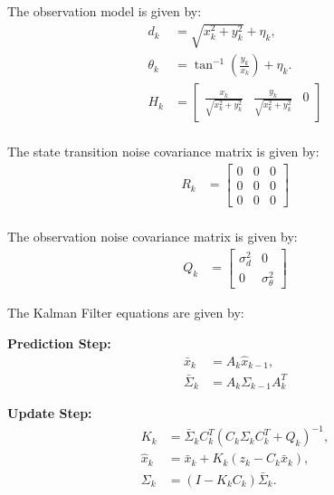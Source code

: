 \documentclass[answers]{exam}
\begin{document}
\begin{questions}
\begin{parts}
\begin{solution}
            The observation model is given by:
            \begin{align*}
                d_k      & = \sqrt{x_k^2 + y_k^2} + \eta_k,                                              \\
                \theta_k & = \tan^{-1}\left(\frac{y_k}{x_k}\right) + \eta_k.                             \\
                H_k      & = \begin{bmatrix}
                                 \frac{x_k}{\sqrt{x_k^2 + y_k^2}} & \frac{y_k}{\sqrt{x_k^2 + y_k^2}} & 0
                             \end{bmatrix} \\
            \end{align*}

            The state transition noise covariance matrix is given by:
            \begin{align*}
                R_k & = \begin{bmatrix}
                            0 & 0 & 0 \\
                            0 & 0 & 0 \\
                            0 & 0 & 0
                        \end{bmatrix} \\
            \end{align*}

            The observation noise covariance matrix is given by:
            \begin{align*}
                Q_k & = \begin{bmatrix}
                            \sigma^2_{d} & 0                 \\
                            0            & \sigma^2_{\theta}
                        \end{bmatrix}
            \end{align*}

            The Kalman Filter equations are given by:

            \textbf{Prediction Step:}
            \begin{align*}
                \bar{x}_{k}      & = A_{k} \hat{x}_{k-1},       \\
                \bar{\Sigma}_{k} & = A_{k} \Sigma_{k-1} A_{k}^T
            \end{align*}

            \textbf{Update Step:}
            \begin{align*}
                K_{k}       & = \bar{\Sigma}_{k} C_{k}^T \left(C_{k} \Sigma_{k} C_{k}^T + Q_{k}\right)^{-1}, \\
                \hat{x}_{k} & = \bar{x}_{k} + K_{k} \left(z_{k} - C_{k} \bar{x}_{k}\right),                  \\
                \Sigma_{k}  & = \left(I - K_{k} C_{k}\right) \bar{\Sigma}_{k}.
            \end{align*}
        \end{solution}


\end{parts}
\end{questions}
\end{document}
